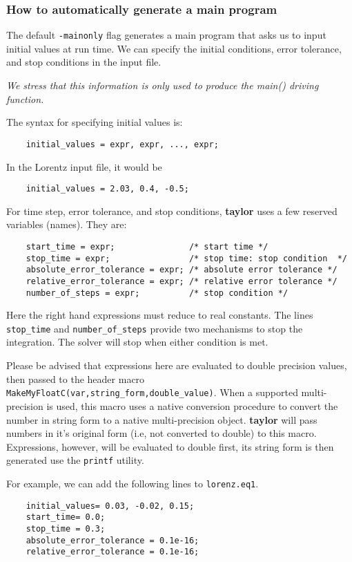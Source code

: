 \documentclass[10pt]{article}
\theoremstyle{remark}
\newcommand{\taylorname}{{\bf taylor}}
\begin{document}
\subsubsection*{How to automatically generate a main program}
The default {\tt -mainonly} flag generates a main program
that asks us to input initial values at run time. We can
specify the initial conditions, error tolerance, and stop conditions
in the input file.

\begin{center}
{\em We stress that this information is only used to produce the
  main() driving function.}
\end{center}

The syntax for specifying initial values is:
\begin{verbatim}
    initial_values = expr, expr, ..., expr;
\end{verbatim}
In the Lorentz input file, it would be
\begin{verbatim}
    initial_values = 2.03, 0.4, -0.5;
\end{verbatim}

For time step, error tolerance, and stop conditions, \taylorname{}
uses a few reserved variables (names).  They are:
\begin{verbatim}
    start_time = expr;               /* start time */
    stop_time = expr;                /* stop time: stop condition  */
    absolute_error_tolerance = expr; /* absolute error tolerance */
    relative_error_tolerance = expr; /* relative error tolerance */
    number_of_steps = expr;          /* stop condition */
\end{verbatim}
Here the right hand expressions must reduce to real constants.  The
lines \verb+stop_time+ and \verb+number_of_steps+ provide two
mechanisms to stop the integration. The solver will stop
when either condition is met.

\bigskip

Please be advised that expressions here are evaluated to double
precision values, then passed to the header macro
\verb+MakeMyFloatC(var,string_form,double_value)+.  When a supported
multi-precision is used, this macro uses a native conversion procedure
to convert the number in string form to a native multi-precision
object.  \taylorname{} will pass numbers in it's original form (i.e,
not converted to double) to this macro.  Expressions, however, will be
evaluated to double first, its string form is then generated use the
\verb+printf+ utility.

\bigskip
For example, we can add the following lines to 
\verb+lorenz.eq1+.
\begin{verbatim}
    initial_values= 0.03, -0.02, 0.15;
    start_time= 0.0;
    stop_time = 0.3;
    absolute_error_tolerance = 0.1e-16;
    relative_error_tolerance = 0.1e-16;
\end{verbatim}
\end{document}
